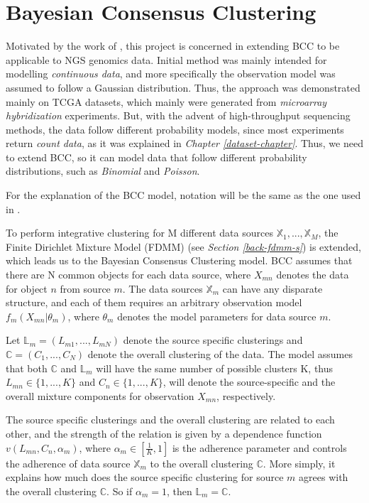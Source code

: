 \section{Bayesian Consensus Clustering} \label{integr-bcc-sect}
Motivated by the work of \citet{Lock2013}, this project is concerned in extending BCC to be applicable to NGS genomics data. Initial method was mainly intended for modelling \emph{continuous data}, and more specifically the observation model was assumed to follow a Gaussian distribution. Thus, the approach was demonstrated mainly on TCGA datasets, which mainly were generated from \emph{microarray hybridization} experiments. But, with the advent of high-throughput sequencing methods, the data follow different probability models, since most experiments return \emph{count data}, as it was explained in \emph{Chapter \ref{dataset-chapter}}. Thus, we need to extend BCC, so it can model data that follow different probability distributions, such as \emph{Binomial} and \emph{Poisson}.

For the explanation of the BCC model, notation will be the same as the one used in \citet{Lock2013}. 

To perform integrative clustering for M different data sources $\mathbb{X}_{1},..., \mathbb{X}_{M}$, the Finite Dirichlet Mixture Model (FDMM) (see \emph{Section \ref{back-fdmm-s}}) is extended, which leads us to the Bayesian Consensus Clustering model. BCC assumes that there are N common objects for each data source, where $X_{mn}$ denotes the data for object $n$ from source $m$. The data sources $\mathbb{X}_{m}$ can have any disparate structure, and each of them requires an arbitrary observation model $f_{m}(X_{mn}|\theta_{m})$, where $\theta_{m}$ denotes the model parameters for data source $m$.

Let $\mathbb{L}_{m} = (L_{m1},...,L_{mN})$ denote the source specific clusterings and $\mathbb{C} = (C_{1},...,C_{N})$ denote the overall clustering of the data. The model assumes that both $\mathbb{C}$ and $\mathbb{L}_{m}$ will have the same number of possible clusters K, thus $L_{mn} \in \lbrace 1,...,K \rbrace$ and $C_{n} \in \lbrace 1,...,K \rbrace$, will denote the source-specific and the overall mixture components for observation $X_{mn}$, respectively.

The source specific clusterings and the overall clustering are related to each other, and the strength of the relation is given by a dependence function $v(L_{mn}, C_{n}, \alpha_{m})$, where $\alpha_{m} \in [\frac{1}{K}, 1]$ is the adherence parameter and controls the adherence of data source $\mathbb{X}_m$ to the overall clustering $\mathbb{C}$. More simply, it explains how much does the source specific clustering for source $m$ agrees with the overall clustering $\mathbb{C}$. So if $\alpha_{m} = 1$, then $\mathbb{L}_{m} = \mathbb{C}$. 

